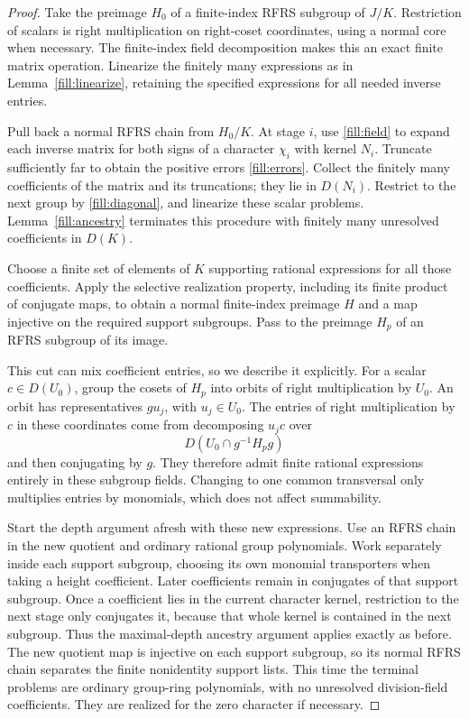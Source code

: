 \begin{proof}
Take the preimage \(H_0\) of a finite-index RFRS subgroup of \(J/K\).
Restriction of scalars is right multiplication on right-coset
coordinates, using a normal core when necessary.  The finite-index
field decomposition makes this an exact finite matrix operation.
Linearize the finitely many expressions as in
Lemma~\ref{fill:linearize}, retaining the specified expressions for
all needed inverse entries.

Pull back a normal RFRS chain from \(H_0/K\).  At stage \(i\), use
\eqref{fill:field} to expand each inverse matrix for both signs of
a character \(\chi_i\) with kernel \(N_i\).  Truncate sufficiently
far to obtain the positive errors \eqref{fill:errors}.  Collect
the finitely many coefficients of the matrix and its truncations;
they lie in \(D(N_i)\).  Restrict to the next group by
\eqref{fill:diagonal}, and linearize these scalar problems.
Lemma~\ref{fill:ancestry} terminates this procedure with finitely
many unresolved coefficients in \(D(K)\).

Choose a finite set of elements of \(K\) supporting rational
expressions for all those coefficients.  Apply the selective
realization property, including its finite product of conjugate
maps, to obtain a normal finite-index preimage \(H\) and a map
injective on the required support subgroups.  Pass to the
preimage \(H_p\) of an RFRS subgroup of its image.

This cut can mix coefficient entries, so we describe it explicitly.
For a scalar \(c\in D(U_0)\), group the cosets of \(H_p\) into
orbits of right multiplication by \(U_0\).  An orbit has
representatives \(gu_j\), with \(u_j\in U_0\).
The entries of right multiplication by \(c\) in these coordinates
come from decomposing \(u_jc\) over
\[
 D(U_0\cap g^{-1}H_p g)
\]
and then conjugating by \(g\).  They therefore admit finite rational
expressions entirely in these subgroup fields.
Changing to one common transversal only multiplies entries by
monomials, which does not affect summability.

Start the depth argument afresh with these new expressions.
Use an RFRS chain in the new quotient and ordinary rational group
polynomials.  Work separately inside each support subgroup,
choosing its own monomial transporters when taking a height
coefficient.  Later coefficients remain in conjugates of that
support subgroup.  Once a coefficient lies in the current
character kernel, restriction to the next stage only conjugates
it, because that whole kernel is contained in the next subgroup.
Thus the maximal-depth ancestry argument applies exactly as
before.  The new quotient map is injective on each support subgroup,
so its normal RFRS chain separates the finite nonidentity support
lists.  This time the terminal problems are ordinary group-ring
polynomials, with no unresolved division-field coefficients.
They are realized for the zero character if necessary.


\end{proof}
